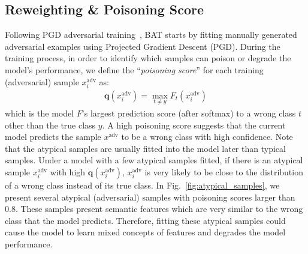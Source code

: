 \subsection{Reweighting \& Poisoning Score} Following PGD adversarial training~\cite{madry2017towards}, BAT starts by fitting manually generated adversarial examples using Projected Gradient Descent (PGD). 
During the training process, in order to identify which samples can poison or degrade the model's performance, we define the ``\textit{poisoning score}'' for each training (adversarial) sample $x_i^\text{adv}$ as:
\begin{align}\label{eq:poisoning_score}
    \textbf{q}(x_i^\text{adv}) = \max_{t\neq y}{F_t(x_i^\text{adv})}
\end{align}
which is the model $F$'s largest prediction score (after softmax) to a wrong class $t$ other than the true class $y$.  A high poisoning score suggests that the current model predicts the sample $x^\text{adv}$ to be a wrong class with high confidence. 
Note that the atypical samples are usually fitted into the model later than typical samples. Under a model with a few atypical samples fitted, if there is an atypical sample $x_i^\text{adv}$ with high $\textbf{q}(x_i^\text{adv})$, $x_i^\text{adv}$ is very likely to be close to the distribution of a wrong class instead of its true class. In Fig.~\ref{fig:atypical_samples}, we present  several atypical (adversarial) samples with  poisoning scores larger than 0.8. These samples present semantic features which are very similar to the wrong class that the model predicts. Therefore, fitting these atypical samples could cause the model to learn mixed concepts of features and degrades the model performance.

